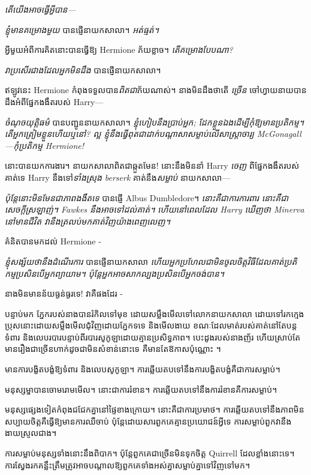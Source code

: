 \emph{តើយើងអាចធ្វើអ្វីបាន—}

\emph{ខ្ញុំ​មាន​គម្រោង​មួយ} បាន​ផ្ញើ​នាយក​សាលា។ \emph{អត់ធ្មត់។}

អ្វី​មួយ​អំពី​ការ​គិត​នោះ​បាន​ធ្វើ​ឱ្យ Hermione ភ័យ​ខ្លាច។ \emph{តើគម្រោងបែបណា?}

\emph{វាប្រសើរជាងដែលអ្នកមិនដឹង} បានផ្ញើនាយកសាលា។

ឥឡូវនេះ Hermione កំពុងទទួលបាន\emph{ពិតជា}ភ័យណាស់។ នាងមិនដឹងថាតើ \emph{ច្រើន} ចៅហ្វាយនាយបានដឹងអំពីផ្នែកងងឹតរបស់ Harry—

\emph{ចំណុចយុត្តិធម៌} បានបញ្ជូននាយកសាលា។ \emph{ខ្ញុំហៀបនឹងប្រាប់អ្នក; ដែកខ្លួនឯងដើម្បីកុំឱ្យមានប្រតិកម្ម។ តើអ្នកត្រៀមខ្លួនហើយឬនៅ? ល្អ ខ្ញុំ​នឹង​ធ្វើ​ពុត​ជា​ដាក់​បណ្តាសា​សម្លាប់​លើ​សាស្ត្រាចារ្យ McGonagall—\emph{កុំ​ប្រតិកម្ម} Hermione!}

នោះបានយកការងារ។ នាយកសាលាពិតជាឆ្កួតមែន! នោះនឹងមិននាំ Harry \emph{ចេញ} ពីផ្នែកងងឹតរបស់គាត់ទេ Harry នឹងទៅ\emph{ទាំងស្រុង berserk} គាត់នឹង\emph{សម្លាប់} នាយកសាលា—

\emph{ប៉ុន្តែនោះមិនមែនជាភាពងងឹតទេ} បានផ្ញើ Albus Dumbledore។ \emph{នោះគឺជាការការពារ នោះគឺជាសេចក្តីស្រឡាញ់។ Fawkes នឹងអាចទៅដល់គាត់។ ហើយនៅពេលដែល Harry ឃើញថា Minerva នៅមានជីវិត វានឹងត្រលប់មកគាត់វិញយ៉ាងពេញលេញ។}

គំនិតបានមកដល់ Hermione -

\emph{ខ្ញុំសង្ស័យថានឹងដំណើរការ} បានផ្ញើនាយកសាលា \emph{ហើយអ្នកប្រហែលជាមិនចូលចិត្តវិធីដែលគាត់ប្រតិកម្មប្រសិនបើអ្នកព្យាយាម។ ប៉ុន្តែអ្នកអាចសាកល្បងប្រសិនបើអ្នកចង់បាន។}

នាង​មិន​មាន​ន័យ​ធ្ងន់​ធ្ងរ​ទេ! វាគឺផងដែរ -

បន្ទាប់មក ភ្នែករបស់នាងបានរំកិលទៅមុខ ដោយសម្លឹងមើលទៅលោកនាយកសាលា ដោយទៅរកក្មេងប្រុសនោះដោយសម្លឹងមើលជុំវិញដោយភ្នែកទទេ និងមើលងាយ ខណៈដែលមាត់របស់គាត់នៅតែបន្តទំពារ និងលេបរបារបន្ទាប់ពីរបារសូកូឡាដោយគ្មានប្រសិទ្ធភាព។ បេះដូង​របស់​នាង​ញ័រ ហើយ​ស្រាប់តែ​មាន​រឿង​ជា​ច្រើន​ហាក់​ដូច​ជា​មិន​សំខាន់​នោះ​ទេ គឺ​មាន​តែ​ឱកាស​ប៉ុណ្ណោះ ។

\later

មានការបង្ខិតបង្ខំឱ្យទំពារ និងលេបសូកូឡា។ ការឆ្លើយតបទៅនឹងការបង្ខិតបង្ខំគឺជាការសម្លាប់។

មនុស្ស​ម្នា​បាន​ចោមរោម​មើល។ នោះជាការរំខាន។ ការឆ្លើយតបទៅនឹងការរំខានគឺការសម្លាប់។

មនុស្សផ្សេងទៀតកំពុងជជែកគ្នានៅផ្ទៃខាងក្រោយ។ នោះគឺជាការប្រមាថ។ ការឆ្លើយតបទៅនឹងភាពមិនសប្បាយចិត្តគឺធ្វើឱ្យមានការឈឺចាប់ ប៉ុន្តែដោយសារពួកគេគ្មានប្រយោជន៍អ្វីទេ ការសម្លាប់ពួកវានឹងងាយស្រួលជាង។

ការ​សម្លាប់​មនុស្ស​ទាំង​នោះ​នឹង​ពិបាក។ ប៉ុន្តែពួកគេជាច្រើនមិនទុកចិត្ត Quirrell ដែលខ្លាំងនោះទេ។ ការស្វែងរកគន្លឹះត្រឹមត្រូវអាចបណ្តាលឱ្យពួកគេទាំងអស់គ្នាសម្លាប់គ្នាទៅវិញទៅមក។

